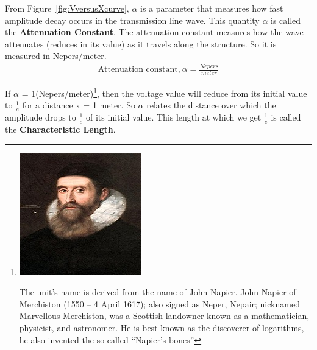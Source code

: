 From Figure~\ref{fig:VversusXcurve}, $\alpha$ is a parameter that measures how fast amplitude decay occurs in the transmission line wave. This quantity $\alpha$ is called the \textbf{Attenuation Constant}. The attenuation constant measures how the wave attenuates (reduces in its value) as it travels along the structure. So it is measured in Nepers/meter.
\begin{align*}
\text{Attenuation constant,}\ \alpha = \frac{Nepers}{meter}
\end{align*}

If $\alpha$ = 1(Nepers/meter)\footnote{
\includegraphics[scale=0.2]{./graphics/johnnapier2}

The unit's name is derived from the name of John Napier. John Napier of Merchiston (1550 – 4 April 1617); also signed as Neper, Nepair; nicknamed Marvellous Merchiston, was a Scottish landowner known as a mathematician, physicist, and astronomer. He is best known as the discoverer of logarithms, he also invented the so-called \textquotedblleft Napier's bones\textquotedblright}, then the voltage value will reduce from its initial value to $\frac{1}{e}$ for a distance x = 1 meter. So $\alpha$ relates the distance over which the amplitude drops to $\frac{1}{e}$ of its initial value. This length at which we get $\frac{1}{e}$ is called the \textbf{Characteristic Length}. 

